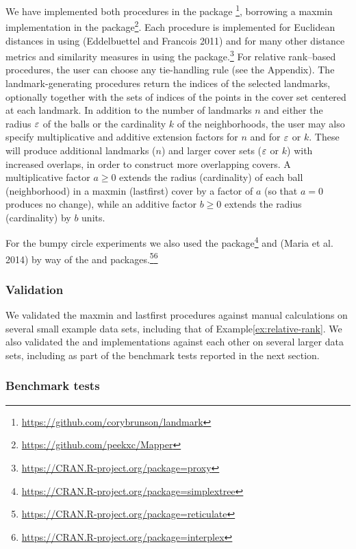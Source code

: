 \documentclass{article}
\begin{document}
We have implemented both procedures in the  package
\footnote{\url{https://github.com/corybrunson/landmark}},
borrowing a maxmin implementation in the 
package\footnote{\url{https://github.com/peekxc/Mapper}}. Each procedure
is implemented for Euclidean distances in  using 
(Eddelbuettel and Francois 2011) and for many other distance metrics and
similarity measures in  using the  package.\footnote{\url{https://CRAN.R-project.org/package=proxy}}
For relative rank--based procedures, the user can choose any
tie-handling rule (see the Appendix). The landmark-generating procedures
return the indices of the selected landmarks, optionally together with
the sets of indices of the points in the cover set centered at each
landmark. In addition to the number of landmarks \(n\) and either the
radius \(\varepsilon\) of the balls or the cardinality \(k\) of the
neighborhoods, the user may also specify multiplicative and additive
extension factors for \(n\) and for \(\varepsilon\) or \(k\). These will
produce additional landmarks (\(n\)) and larger cover sets (\(\varepsilon\) or
\(k\)) with increased overlaps, in order to construct more overlapping
covers. A multiplicative factor \(a \geq 0\) extends the radius
(cardinality) of each ball (neighborhood) in a maxmin (lastfirst) cover
by a factor of \(a\) (so that \(a = 0\) produces no change), while an
additive factor \(b \geq 0\) extends the radius (cardinality) by \(b\)
units.

For the bumpy circle experiments we also used the 
package\footnote{\url{https://CRAN.R-project.org/package=simplextree}}
and  (Maria et al. 2014) by way of the
 and  packages.\footnote{\url{https://CRAN.R-project.org/package=reticulate}}\footnote{\url{https://CRAN.R-project.org/package=interplex}}

\hypertarget{validation}{%
\subsubsection{Validation}\label{validation}}

We validated the maxmin and lastfirst procedures against manual
calculations on several small example data sets, including that of
Example\nbs\ref{ex:relative-rank}. We also validated the  and
 implementations against each other on several larger data sets,
including as part of the benchmark tests reported in the next section.

\hypertarget{benchmark-tests}{%
\subsubsection{Benchmark tests}\label{benchmark-tests}}
\end{document}
